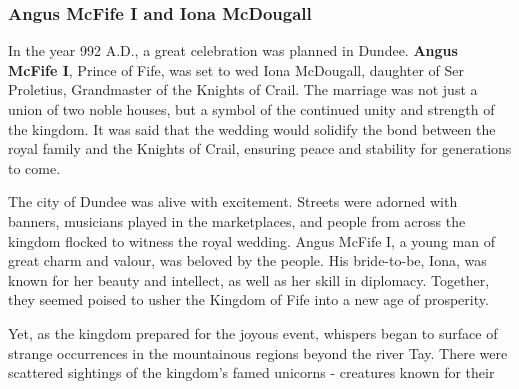 \subsubsection*{Angus McFife I and Iona McDougall}
{\entryfont In the year 992 A.D., a great celebration was planned in Dundee. \textbf{Angus McFife I}, Prince of Fife, was set to wed Iona McDougall, daughter of Ser Proletius, Grandmaster of the Knights of Crail. The marriage was not just a union of two noble houses, but a symbol of the continued unity and strength of the kingdom. It was said that the wedding would solidify the bond between the royal family and the Knights of Crail, ensuring peace and stability for generations to come.

The city of Dundee was alive with excitement. Streets were adorned with banners, musicians played in the marketplaces, and people from across the kingdom flocked to witness the royal wedding. Angus McFife I, a young man of great charm and valour, was beloved by the people. His bride-to-be, Iona, was known for her beauty and intellect, as well as her skill in diplomacy. Together, they seemed poised to usher the Kingdom of Fife into a new age of prosperity.

Yet, as the kingdom prepared for the joyous event, whispers began to surface of strange occurrences in the mountainous regions beyond the river Tay. There were scattered sightings of the kingdom's famed unicorns - creatures known for their}
\onecolumn
